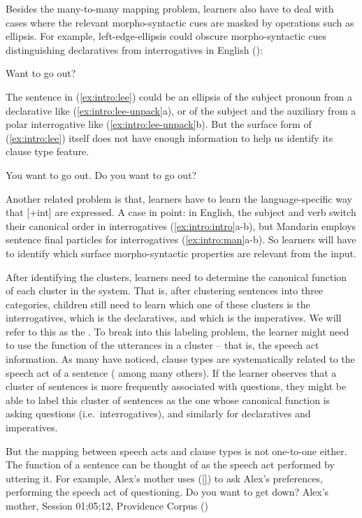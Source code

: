 Besides the many-to-many mapping problem, learners also have to deal with cases where the relevant morpho-syntactic cues are masked by operations such as ellipsis.  For example, left-edge-ellipsis could obscure morpho-syntactic cues distinguishing declaratives from interrogatives in English (\cite{zwickypullum1983leftedge}):

Want to go out?
\eex

The sentence in (\ref{ex:intro:lee}) could be an ellipsis of  the subject pronoun from a declarative like (\ref{ex:intro:lee-unpack}a), or of the subject and the auxiliary from a polar interrogative like (\ref{ex:intro:lee-unpack}b). But the surface form of (\ref{ex:intro:lee}) itself does not have enough information to help us identify its clause type feature. 

\bxl
You want to go out.
\ex Do you want to go out?
\exl
\eex


Another related problem is that, learners have to learn the language-specific way that [+int] are expressed. A case in point: in English, the subject and verb switch their canonical order in interrogatives (\ref{ex:intro:intro}a-b), but Mandarin employs sentence final particles for interrogatives (\ref{ex:intro:man}a-b). So learners will have to identify which surface morpho-syntactic properties are relevant from the input.  

After identifying the clusters, learners need to determine the canonical function of each cluster in the system. That is, after clustering sentences into three categories, children still need to learn which one of these clusters is the interrogatives, which is the declaratives, and which is the imperatives. We will refer to this as the . To break into this labeling problem, the learner might need to use the function of the utterances in a cluster -- that is, the speech act information. As many have noticed, clause types are systematically related to the speech act of a sentence (\cite{katzpostal1964, sz1985speechact, portner2018} among many others). If the learner observes that a cluster of sentences is more frequently associated with questions, they might be able to label this cluster of sentences as the one whose canonical function is asking questions (i.e.\ interrogatives), and similarly for declaratives and imperatives. 

But the mapping between speech acts and clause types is not one-to-one either. The function of a sentence can be thought of as the speech act performed by uttering it. For example, Alex's mother uses (\ref{}) to ask Alex's preferences, performing the speech act of questioning.
\bex{}
Do you want to get down? \hfill Alex's mother, Session 01;05;12, Providence Corpus (\cite{ProvidenceCorpus})
\eex

